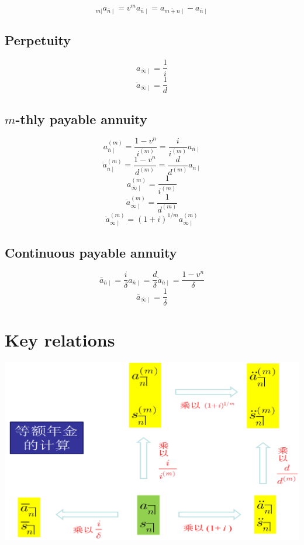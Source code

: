 \documentclass[
]{book}
\begin{document}
\[_{m|}a_{\overline{n}\mid}=v^ma_{\overline{n}\mid}=a_{\overline{m+n}\mid}-a_{\overline{n}\mid}\]

\hypertarget{perpetuity}{%
\subsection*{Perpetuity}\label{perpetuity}}

\[a_{\overline{\infty}\mid}=\frac{1}{i}\]
\[\ddot{a}_{\overline{\infty}\mid}=\frac{1}{d}\]

\hypertarget{m-thly-payable-annuity}{%
\subsection*{\texorpdfstring{\(m\)-thly payable annuity}{m-thly payable annuity}}\label{m-thly-payable-annuity}}

\[a^{(m)}_{\overline{n}\mid}=\frac{1-v^n}{i^{(m)}}=\frac{i}{i^{(m)}}a_{\overline{n}\mid}\]
\[\ddot{a}^{(m)}_{\overline{n}\mid}=\frac{1-v^n}{d^{(m)}}=\frac{d}{d^{(m)}}a_{\overline{n}\mid}\]
\[a^{(m)}_{\overline{\infty}\mid}=\frac{1}{i^{(m)}}\]
\[\ddot{a}^{(m)}_{\overline{\infty}\mid}=\frac{1}{d^{(m)}}\]
\[\ddot{a}^{(m)}_{\overline{\infty}\mid}=(1+i)^{1/m}a^{(m)}_{\overline{\infty}\mid}\]

\hypertarget{continuous-payable-annuity}{%
\subsection*{Continuous payable annuity}\label{continuous-payable-annuity}}

\[\bar{a}_{\overline{n}\mid}=\frac{i}{\delta}{a}_{\overline{n}\mid}=\frac{d}{\delta}\ddot{a}_{\overline{n}\mid}=\frac{1-v^n}{\delta}\]
\[\bar{a}_{\overline{\infty}\mid}=\frac{1}{\delta}\]

\hypertarget{key-relations}{%
\section{Key relations}\label{key-relations}}

\begin{center}\includegraphics[width=0.5\linewidth]{./plots/annuity-1} \end{center}
\end{document}
